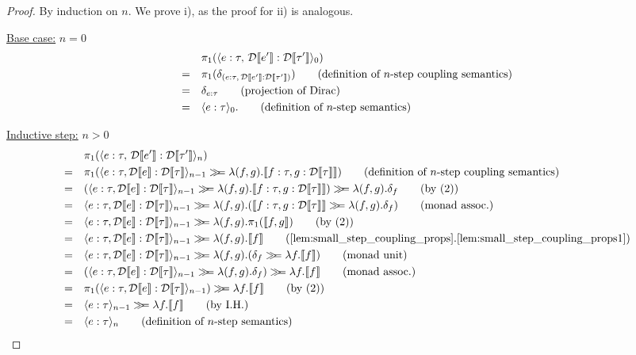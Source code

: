 \begin{proof}
	By induction on $n$. We prove i), as the proof for ii) is analogous.

	\underline{Base case:} $n=0$
	\begin{align*}
		&\pi_1\!\left(\langle e:\tau,\,\mathcal{D}\llbracket e' \rrbracket:\mathcal{D}\llbracket \tau' \rrbracket \rangle_{0}\right) \\
		= \quad&\pi_1(\delta_{(e:\tau,\,\mathcal{D}\llbracket e' \rrbracket:\mathcal{D}\llbracket \tau' \rrbracket)}) \tag{definition of $n$-step coupling semantics}\\
		= \quad&\delta_{e:\tau} \tag{projection of Dirac} \\
		= \quad&\langle e:\tau \rangle_{0}. \tag{definition of $n$-step semantics}\\
	\end{align*}
	
	\underline{Inductive step:} $n > 0$
	\begin{align*}
		&\pi_1\!\left(\bigsemstep{e:\tau,\,\discretize{e'}:\discretize{\tau'}}{n}\right) \\
		= \quad&\pi_1(\bigsemstep{e : \tau, \discretize{e} : \discretize{\tau}}{n-1} \monbind  \lambda (f, g). \sem{f : \tau, g : \discretize{\tau}}) \tag{definition of $n$-step coupling semantics}\\
		= \quad&(\bigsemstep{e : \tau, \discretize{e} : \discretize{\tau}}{n-1} \monbind  \lambda (f, g). \sem{f : \tau, g : \discretize{\tau}}) \monbind \lambda (f,g).\dirac{f} \tag{by (2)} \\
		= \quad&\bigsemstep{e : \tau, \discretize{e} : \discretize{\tau}}{n-1} \monbind  \lambda (f, g). (\sem{f : \tau, g : \discretize{\tau}} \monbind \lambda (f,g).\dirac{f}) \tag{monad assoc.}\\
		= \quad&\bigsemstep{e : \tau, \discretize{e} : \discretize{\tau}}{n-1} \monbind  \lambda (f, g). \pi_1(\sem{f,g}) \tag{by (2)}\\
		= \quad&\bigsemstep{e : \tau, \discretize{e} : \discretize{\tau}}{n-1} \monbind  \lambda (f, g). \sem{f} \tag{\Cref{lem:small_step_coupling_props}.\ref{lem:small_step_coupling_props1}}\\
		= \quad&\bigsemstep{e : \tau, \discretize{e} : \discretize{\tau}}{n-1} \monbind  \lambda (f, g). (\dirac{f} \monbind \lambda f.\sem{f}) \tag{monad unit}\\
		= \quad&(\bigsemstep{e : \tau, \discretize{e} : \discretize{\tau}}{n-1} \monbind  \lambda (f, g). \dirac{f}) \monbind \lambda f.\sem{f} \tag{monad assoc.}\\
		= \quad&\pi_1(\bigsemstep{e : \tau, \discretize{e} : \discretize{\tau}}{n-1}) \monbind \lambda f.\sem{f} \tag{by (2)}\\
		= \quad&\bigsemstep{e : \tau}{n-1} \monbind \lambda f.\sem{f} \tag{by I.H.}\\
		= \quad&\bigsemstep{e : \tau}{n} \tag{definition of $n$-step semantics}
	\end{align*}
\end{proof}

